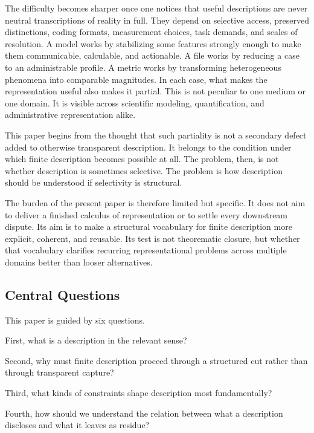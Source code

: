 \documentclass[11pt]{article}
\begin{document}
The difficulty becomes sharper once one notices that useful descriptions are never neutral transcriptions of reality in full. They depend on selective access, preserved distinctions, coding formats, measurement choices, task demands, and scales of resolution. A model works by stabilizing some features strongly enough to make them communicable, calculable, and actionable. A file works by reducing a case to an administrable profile. A metric works by transforming heterogeneous phenomena into comparable magnitudes. In each case, what makes the representation useful also makes it partial. This is not peculiar to one medium or one domain. It is visible across scientific modeling, quantification, and administrative representation alike. \cite{frigg_hartmann_models_sep,frigg_nguyen_scientific_representation_sep,espeland_stevens_quantification,merry_seductions_of_quantification,porter_trust_in_numbers}

This paper begins from the thought that such partiality is not a secondary defect added to otherwise transparent description. It belongs to the condition under which finite description becomes possible at all. The problem, then, is not whether description is sometimes selective. The problem is how description should be understood if selectivity is structural.

The burden of the present paper is therefore limited but specific. It does not aim to deliver a finished calculus of representation or to settle every downstream dispute. Its aim is to make a structural vocabulary for finite description more explicit, coherent, and reusable. Its test is not theorematic closure, but whether that vocabulary clarifies recurring representational problems across multiple domains better than looser alternatives.

\subsection{Central Questions}

This paper is guided by six questions.

First, what is a description in the relevant sense?

Second, why must finite description proceed through a structured cut rather than through transparent capture?

Third, what kinds of constraints shape description most fundamentally?

Fourth, how should we understand the relation between what a description discloses and what it leaves as residue?
\end{document}
